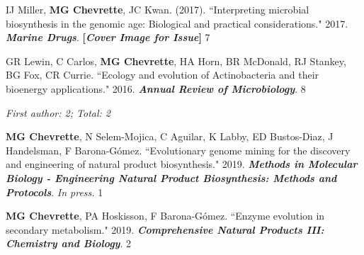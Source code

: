 \begin{cvpubs}
\cvpub
{IJ Miller, \textbf{MG Chevrette}, JC Kwan. (2017). ``Interpreting microbial biosynthesis in the genomic age: Biological and practical considerations." 2017. \textit{\textbf{Marine Drugs}}. \textbf{\textit{}} \linebreak \textbf{[\textit{Cover Image for Issue}]}}
{7}

\cvpub
{GR Lewin, C Carlos, \textbf{MG Chevrette}, HA Horn, BR McDonald, RJ Stankey, BG Fox, CR Currie. ``Ecology and evolution of Actinobacteria and their bioenergy applications." 2016. \textit{\textbf{Annual Review of Microbiology}}. \textbf{\textit{}}}
{8}

\end{cvpubs}



 \vspace{-2mm}

\begin{cvpubs}

\cvpub
{\hspace{-1cm} \textit{First author: 2; Total: 2}}
{}

\cvpub
{\textbf{MG Chevrette}, N Selem-Mojica, C Aguilar, K Labby, ED Bustos-Diaz, J Handelsman, F Barona-G\'{o}mez. ``Evolutionary genome mining for the discovery and engineering of natural product biosynthesis." 2019. \textit{\textbf{Methods in Molecular Biology - Engineering Natural Product Biosynthesis: Methods and Protocols}}. \textit{In press.}}
{1}

\cvpub
{\textbf{MG Chevrette}, PA Hoskisson, F Barona-G\'{o}mez. ``Enzyme evolution in secondary metabolism." 2019. \textit{\textbf{Comprehensive Natural Products III: Chemistry and Biology}}. \textbf{\textit{}}}
{2}

\end{cvpubs}


 \vspace{-2mm}

